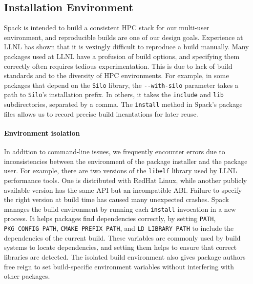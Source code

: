 

\subsection{Installation Environment}

Spack is intended to build a consistent HPC stack for our multi-user
environment, and reproducible builds are one of our design goals.
Experience at LLNL has shown that it is vexingly difficult to reproduce
a build manually.
%
Many packages used at LLNL have a profusion of build options, and specifying them 
correctly often requires tedious experimentation.  This is due to lack of
build standards and to the diversity of HPC environments.  
For example, in some packages that depend on the {\tt Silo} library,
the \verb|--with-silo| parameter takes a path to {\tt Silo}'s installation prefix.
In others, it takes the {\tt include} and {\tt lib} subdirectories,
separated by a comma.
The {\tt install} method in Spack's package files allows us to record
precise build incantations for later reuse.

\paragraph{Environment isolation}
In addition to command-line issues, we
frequently encounter errors due to inconsistencies between the environment of
the package installer and the package user.
%
For example, there are two versions of the {\tt libelf} library used by
LLNL performance tools. One is distributed with RedHat Linux, while another
publicly available version has the same API but an incompatible ABI.
Failure to specify the right version at build time has caused many
unexpected crashes.
%
Spack manages the build environment by running each {\tt install} invocation
in a new process.  It helps packages find dependencies 
correctly, by setting
{\tt PATH}, {\tt PKG\_CONFIG\_PATH}, {\tt CMAKE\_PREFIX\_PATH}, and
{\tt LD\_LIBRARY\_PATH} to include the dependencies of the current build.
These variables are commonly used by build systems to locate dependencies,
and setting them helps to ensure that correct libraries are detected.
The isolated build environment also gives package authors 
free reign to set build-specific environment variables without interfering
with other packages.


